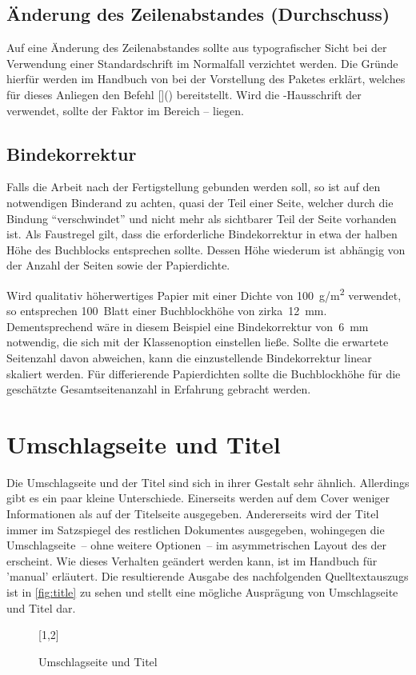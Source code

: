 \documentclass[%
  english,ngerman,%
  cdgeometry=no,DIV=12,automark%
]{tudscrartcl}
\begin{document}
\subsection{Änderung des Zeilenabstandes (Durchschuss)}
Auf eine Änderung des Zeilenabstandes sollte aus typografischer Sicht bei der 
Verwendung einer Standardschrift im Normalfall verzichtet werden. Die Gründe 
hierfür werden im Handbuch von \TUDScript bei der Vorstellung des Paketes 
 erklärt, welches für dieses Anliegen den Befehl 
[]() bereitstellt. Wird 
die \OpenSans-Hausschrift der \TnUD verwendet, sollte der Faktor im Bereich 
-- liegen.

\subsection{Bindekorrektur}
\label{sec:bcor}%
%
Falls die Arbeit nach der Fertigstellung gebunden werden soll, so ist auf den 
notwendigen Binderand zu achten, quasi der Teil einer Seite, welcher durch die 
Bindung \enquote{verschwindet} und nicht mehr als sichtbarer Teil der Seite 
vorhanden ist. Als Faustregel gilt, dass die erforderliche Bindekorrektur in 
etwa der halben Höhe des Buchblocks entsprechen sollte. Dessen Höhe wiederum 
ist abhängig von der Anzahl der Seiten sowie der Papierdichte.

Wird qualitativ höherwertiges Papier mit einer Dichte von \SI{100}{g/m^2} 
verwendet, so entsprechen 100~Blatt einer Buchblockhöhe von zirka~\SI{12}{mm}. 
Dementsprechend wäre in diesem Beispiel eine Bindekorrektur von~\SI{6}{mm} 
notwendig, die sich mit der Klassenoption  einstellen ließe. 
Sollte die erwartete Seitenzahl davon abweichen, kann die einzustellende 
Bindekorrektur linear skaliert werden. Für differierende Papierdichten sollte 
die Buchblockhöhe für die geschätzte Gesamtseitenanzahl in Erfahrung gebracht 
werden.



\section{Umschlagseite und Titel}
Die Umschlagseite und der Titel sind sich in ihrer Gestalt sehr ähnlich. 
Allerdings gibt es ein paar kleine Unterschiede. Einerseits werden auf dem 
Cover weniger Informationen als auf der Titelseite ausgegeben. Andererseits 
wird der Titel immer im Satzspiegel des restlichen Dokumentes ausgegeben, 
wohingegen die Umschlagseite~-- ohne weitere Optionen~-- im asymmetrischen 
Layout des \CDs der \TnUD erscheint. Wie dieses Verhalten geändert werden kann, 
ist im Handbuch für 'manual' erläutert. Die resultierende 
Ausgabe des nachfolgenden Quelltextauszugs ist in \autoref{fig:title} zu sehen 
und stellt eine mögliche Ausprägung von Umschlagseite und Titel dar.
%
\begin{figure}
[1,2]
\caption{Umschlagseite und Titel}
\label{fig:title}
\end{figure}
\end{document}
